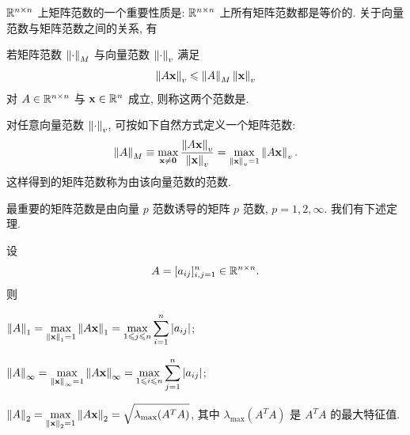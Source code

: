 $\mathbb{R}^{n\times n}$ 上矩阵范数的一个重要性质是: $\mathbb{R}^{n\times n}$ 上所有矩阵范数都是等价的. 关于向量范数与矩阵范数之间的关系, 有

\begin{definition}
\label{def:3-3}
若矩阵范数 $\left\|\cdot\right\|_M$ 与向量范数 $\left\|\cdot\right\|_v$ 满足
\[
  \left\|A\mathbf{x}\right\|_v\leqslant\left\|A\right\|_M\left\|\mathbf{x}\right\|_v
\]
对 $A\in\mathbb{R}^{n\times n}$ 与 $\mathbf{x}\in\mathbb{R}^n$ 成立, 则称这两个范数是.
\end{definition}

对任意向量范数 $\left\|\cdot\right\|_v$, 可按如下自然方式定义一个矩阵范数:
\[
  \left\|A\right\|_M\equiv\max_{\mathbf{x}\neq\mathbf{0}}\frac{\left\|A\mathbf{x}\right\|_v}{\left\|\mathbf{x}\right\|_v}
  =\max_{\left\|\mathbf{x}\right\|_v=1}\left\|A\mathbf{x}\right\|_v.
\]
这样得到的矩阵范数称为由该向量范数的范数.

最重要的矩阵范数是由向量 $p$ 范数诱导的矩阵 $p$ 范数, $p=1,2,\infty$. 我们有下述定理.

\begin{theorem}
\label{thm:3-2}
设
\[
  A=[a_{ij}]_{i,j=1}^{n}\in\mathbb{R}^{n\times n}.
\]
则
\begin{romanlist}
  \item $\displaystyle\left\|A\right\|_1=\max_{\left\|\mathbf{x}\right\|_1=1}\left\|A\mathbf{x}\right\|_1
    =\max_{1\leqslant j\leqslant n}\sum_{i=1}^{n}\left|a_{ij}\right|$;
  \item $\displaystyle\left\|A\right\|_\infty=\max_{\left\|\mathbf{x}\right\|_\infty=1}\left\|A\mathbf{x}\right\|_\infty
    =\max_{1\leqslant i\leqslant n}\sum_{j=1}^{n}\left|a_{ij}\right|$;
  \item $\displaystyle\left\|A\right\|_2=\max_{\left\|\mathbf{x}\right\|_2=1}\left\|A\mathbf{x}\right\|_2
    =\sqrt{\lambda_{\max}(A^TA)}$, 其中 $\lambda_{\max}(A^TA)$ 是 $A^TA$ 的最大特征值.
\end{romanlist}
\end{theorem}


